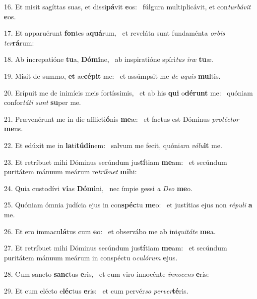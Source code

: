 16. Et misit sagíttas suas, et dissi\textbf{pá}vit \textbf{e}os: \ast\  fúlgura multiplicávit, et con\textit{tur}\textit{bá}\textit{vit} \textbf{e}os.\

17. Et apparuérunt \textbf{fon}tes a\textbf{quá}rum, \ast\  et reveláta sunt fundaménta \textit{or}\textit{bis} \textit{ter}\textbf{rá}rum:\

18. Ab increpatióne \textbf{tu}a, \textbf{Dó}\textbf{mi}ne, \ast\  ab inspiratióne spíri\textit{tus} \textit{i}\textit{ræ} \textbf{tu}æ.\

19. Misit de summo, \textbf{et} ac\textbf{cé}\textbf{pit} me: \ast\  et assúmpsit me \textit{de} \textit{a}\textit{quis} \textbf{mul}tis.\

20. Erípuit me de inimícis meis fortíssimis, \dag\  et ab his \textbf{qui} o\textbf{dé}\textbf{runt} me: \ast\  quóniam confor\textit{tá}\textit{ti} \textit{sunt} \textbf{su}per me.\

21. Prævenérunt me in die afflicti\textbf{ó}nis \textbf{me}æ: \ast\  et factus est Dóminus \textit{pro}\textit{téc}\textit{tor} \textbf{me}us.\

22. Et edúxit me in \textbf{la}ti\textbf{tú}\textbf{di}nem: \ast\  salvum me fecit, quóni\textit{am} \textit{vó}\textit{lu}\textbf{it} me.\

23. Et retríbuet mihi Dóminus secúndum jus\textbf{tí}tiam \textbf{me}am: \ast\  et secúndum puritátem mánuum meárum re\textit{trí}\textit{bu}\textit{et} \textbf{mi}hi:\

24. Quia custodívi \textbf{vi}as \textbf{Dó}\textbf{mi}ni, \ast\  nec ímpie gessi \textit{a} \textit{De}\textit{o} \textbf{me}o.\

25. Quóniam ómnia judícia ejus in con\textbf{spéc}tu \textbf{me}o: \ast\  et justítias ejus non \textit{ré}\textit{pu}\textit{li} \textbf{a} me.\

26. Et ero immacu\textbf{lá}tus cum \textbf{e}o: \ast\  et observábo me ab ini\textit{qui}\textit{tá}\textit{te} \textbf{me}a.\

27. Et retríbuet mihi Dóminus secúndum jus\textbf{tí}tiam \textbf{me}am: \ast\  et secúndum puritátem mánuum meárum in conspéctu o\textit{cu}\textit{ló}\textit{rum} \textbf{e}jus.\

28. Cum sancto \textbf{sanc}tus \textbf{e}ris, \ast\  et cum viro innocénte \textit{ín}\textit{no}\textit{cens} \textbf{e}ris:\

29. Et cum elécto e\textbf{léc}tus \textbf{e}ris: \ast\  et cum pervér\textit{so} \textit{per}\textit{ver}\textbf{té}ris.\

